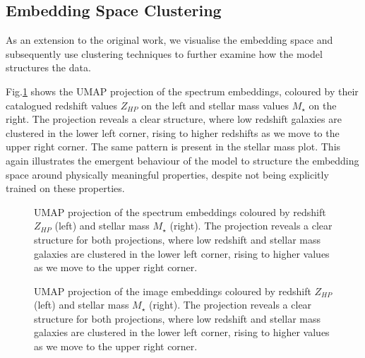 \documentclass[a4paper,12pt]{article}
\begin{document}
\subsection{Embedding Space Clustering}
As an extension to the original work, we visualise the embedding space and subsequently use clustering techniques to further examine how the model structures the data. 

Fig.\ref{fig:umap_of_spectra} shows the UMAP projection of the spectrum embeddings, coloured by their catalogued redshift values $Z_{HP}$ on the left and stellar mass values $M_{\star}$ on the right. The projection reveals a clear structure, where low redshift galaxies are clustered in the lower left corner, rising to higher redshifts as we move to the upper right corner. The same pattern is present in the stellar mass plot. This again illustrates the emergent behaviour of the model to structure the embedding space around physically meaningful properties, despite not being explicitly trained on these properties. 


\begin{figure}[H]
    \centering
    \caption{UMAP projection of the spectrum embeddings coloured by redshift $Z_{HP}$ (left) and stellar mass $M_{\star}$ (right). The projection reveals a clear structure for both projections, where low redshift and stellar mass galaxies are clustered in the lower left corner, rising to higher values as we move to the upper right corner.}
    \label{fig:umap_of_spectra}
\end{figure}

\begin{figure}[H]
    \centering
    \caption{UMAP projection of the image embeddings coloured by redshift $Z_{HP}$ (left) and stellar mass $M_{\star}$ (right). The projection reveals a clear structure for both projections, where low redshift and stellar mass galaxies are clustered in the lower left corner, rising to higher values as we move to the upper right corner.}
    \label{fig:umap_of_images}
\end{figure}
\end{document}
